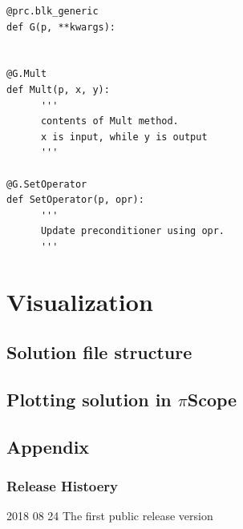 \documentclass[11pt,a4paper,final]{report}
\begin{document}
\begin{minipage}[c]{0.95\textwidth}
\begin{lstlisting}[caption={A user defined generic preconditioner},captionpos=b, frame=single, label={prc3}]
@prc.blk_generic
def G(p, **kwargs):


@G.Mult
def Mult(p, x, y):
      '''
      contents of Mult method. 
      x is input, while y is output
      '''

@G.SetOperator
def SetOperator(p, opr):
      '''
      Update preconditioner using opr.
      '''
\end{lstlisting}
 \end{minipage}




\chapter{Visualization}
\section{Solution file structure}
\section{Plotting solution in $\pi$Scope}

\section{Appendix}
\subsection{Release Histoery}

2018 08 24  The first public release version
\end{document}
